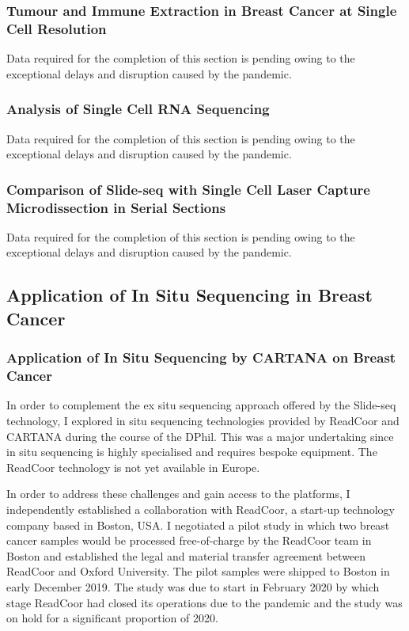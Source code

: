 \subsubsection{Tumour and Immune Extraction in Breast Cancer at Single Cell Resolution}
Data required for the completion of this section is pending owing to the exceptional delays and disruption caused by the pandemic. 

\subsubsection{Analysis of Single Cell RNA Sequencing}
Data required for the completion of this section is pending owing to the exceptional delays and disruption caused by the pandemic. 

\subsubsection{Comparison of Slide-seq with Single Cell Laser Capture Microdissection in Serial Sections}
Data required for the completion of this section is pending owing to the exceptional delays and disruption caused by the pandemic. 

\subsection{Application of In Situ Sequencing in Breast Cancer}
\subsubsection{Application of In Situ Sequencing by CARTANA on Breast Cancer}
In order to complement the ex situ sequencing approach offered by the Slide-seq technology, I explored in situ sequencing technologies provided by ReadCoor and CARTANA during the course of the DPhil. This was a major undertaking since in situ sequencing is highly specialised and requires bespoke equipment. The ReadCoor technology is not yet available in Europe.

In order to address these challenges and gain access to the platforms, I independently established a collaboration with ReadCoor, a start-up technology company based in Boston, USA. I negotiated a pilot study in which two breast cancer samples would be processed free-of-charge by the ReadCoor team in Boston and established the legal and material transfer agreement between ReadCoor and Oxford University. The pilot samples were shipped to Boston in early December 2019. The study was due to start in February 2020 by which stage ReadCoor had closed its operations due to the pandemic and the study was on hold for a significant proportion of 2020. 

